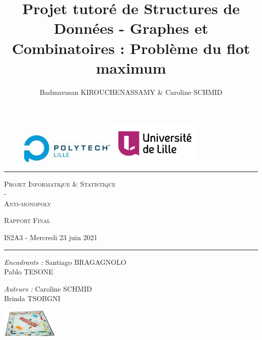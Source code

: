 \documentclass[11pt, a4paper]{report}
\author{Badmavasan KIROUCHENASSAMY \& Caroline SCHMID}
\date{}
\title{Projet tutoré de Structures de Données - Graphes et Combinatoires : Problème du flot maximum}
\begin{document}
	\begin{titlepage}
		\begin{center}
			
			\vspace*{1cm}
			
			\begin{figure}[h]
				\centering
				\includegraphics[width=0.4\textwidth]{images/LOGO_Polytech-lille.jpg}
				\hspace{2cm}
				\includegraphics[width=0.4\textwidth]{images/logo_ulille_transparent.png}
			\end{figure}
			
			\vspace*{2cm}
			
			\rule{1\textwidth}{.8pt}
			
			\LARGE{\textsc{Projet Informatique \& Statistique\\-\\Anti-monopoly}}
			
			\vspace*{1cm}
			
			\LARGE{\textsc{Rapport Final}}
			\vspace*{1cm}
			
			\small{IS2A3 - Mercredi 23 juin 2021}
			
			\vspace*{0.5cm}
			\rule{1\textwidth}{.10pt}
		
			\vspace*{2.352cm}
			
			\large{\textit{Encadrants :} Santiago BRAGAGNOLO\\Pablo TESONE}
			
			\vspace*{0.1cm}	        
			
			\large{\textit{Auteurs :} {Caroline SCHMID\\Brinda TSOBGNI}}
			
		\end{center}
	
	\includegraphics[width=0.2\textwidth]{images/MONOPOLY.jpg}
		
	\end{titlepage}
	
\end{document}
